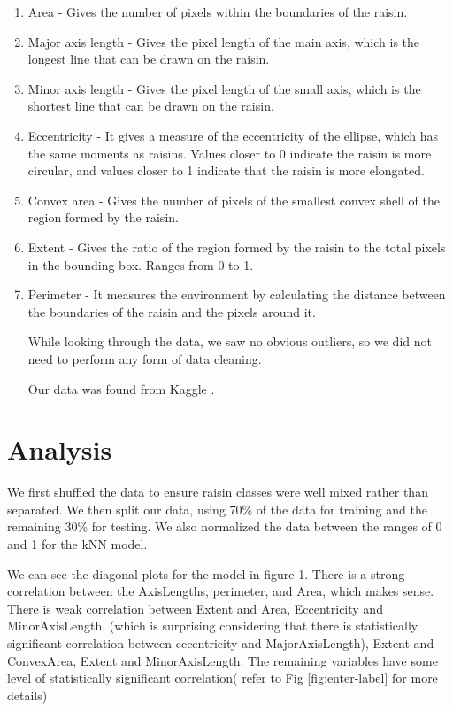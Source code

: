 \documentclass{article}
\begin{document}
\begin{enumerate}
    \item Area - Gives the number of pixels within the boundaries of the raisin.
\item Major axis length - Gives the pixel length of the main axis, which is the longest line that can be drawn on the raisin.

\item Minor axis length - Gives the pixel length of the small axis, which is the shortest line that can be drawn on the raisin.

\item Eccentricity - It gives a measure of the eccentricity of the ellipse, which has the same moments as raisins.  Values closer to 0 indicate the raisin is more circular, and values closer to 1 indicate that the raisin is more elongated.

\item Convex area - Gives the number of pixels of the smallest convex shell of the region formed by the raisin.

\item Extent - Gives the ratio of the region formed by the raisin to the total pixels in the bounding box.  Ranges from 0 to 1.

\item Perimeter - It measures the environment by calculating the distance between the boundaries of the raisin and the pixels around it.

While looking through the data, we saw no obvious outliers, so we did not need to perform any form of data cleaning. 

Our data was found from Kaggle \cite{Raisin}. 

\end{enumerate}

\section{Analysis}

We first shuffled the data to ensure raisin classes were well mixed rather than separated. We then split our data, using 70\% of the data for training and the remaining 30\% for testing. We also normalized the data between the ranges of 0 and 1 for the kNN model. 

We can see the diagonal plots for the model in figure 1. There is a strong correlation between the AxisLengths, perimeter, and  Area, which makes sense. There is weak correlation between Extent and Area, Eccentricity and MinorAxisLength, (which is surprising considering that there is statistically significant correlation between eccentricity and MajorAxisLength), Extent and ConvexArea, Extent and MinorAxisLength. The remaining variables have some level of statistically significant correlation( refer to Fig \ref{fig:enter-label} for more details)
\end{document}
